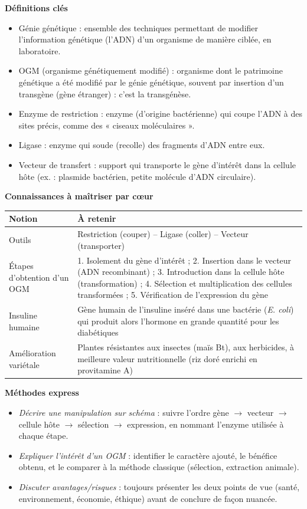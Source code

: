 \documentclass[11pt]{article}
\newcommand{\cle}[1]{{\popxbold\color{popdark}#1}}
\begin{document}
\begin{bilan}
\textbf{Définitions clés}
\begin{itemize}
  \item \cle{Génie génétique} : ensemble des techniques permettant de modifier l'information génétique (l'ADN) d'un organisme de manière ciblée, en laboratoire.
  \item \cle{OGM} (organisme génétiquement modifié) : organisme dont le patrimoine génétique a été modifié par le génie génétique, souvent par insertion d'un \cle{transgène} (gène étranger) : c'est la \cle{transgénèse}.
  \item \cle{Enzyme de restriction} : enzyme (d'origine bactérienne) qui coupe l'ADN à des sites précis, comme des « ciseaux moléculaires ».
  \item \cle{Ligase} : enzyme qui soude (recolle) des fragments d'ADN entre eux.
  \item \cle{Vecteur de transfert} : support qui transporte le gène d'intérêt dans la cellule hôte (ex. : \cle{plasmide} bactérien, petite molécule d'ADN circulaire).
\end{itemize}

\textbf{Connaissances à maîtriser par c\oe ur}
\begin{center}
\begin{tabularx}{\linewidth}{|l|X|}
\hline
\rowcolor{popblueL} \textbf{Notion} & \textbf{À retenir} \\
\hline
Outils & Restriction (couper) -- Ligase (coller) -- Vecteur (transporter) \\
\hline
Étapes d'obtention d'un OGM & 1. Isolement du gène d'intérêt ; 2. Insertion dans le vecteur (ADN recombinant) ; 3. Introduction dans la cellule hôte (transformation) ; 4. Sélection et multiplication des cellules transformées ; 5. Vérification de l'expression du gène \\
\hline
Insuline humaine & Gène humain de l'insuline inséré dans une bactérie (\emph{E. coli}) qui produit alors l'hormone en grande quantité pour les diabétiques \\
\hline
Amélioration variétale & Plantes résistantes aux insectes (maïs Bt), aux herbicides, à meilleure valeur nutritionnelle (riz doré enrichi en provitamine A) \\
\hline
\end{tabularx}
\end{center}

\textbf{Méthodes express}
\begin{itemize}
  \item \emph{Décrire une manipulation sur schéma} : suivre l'ordre gène $\rightarrow$ vecteur $\rightarrow$ cellule hôte $\rightarrow$ sélection $\rightarrow$ expression, en nommant l'enzyme utilisée à chaque étape.
  \item \emph{Expliquer l'intérêt d'un OGM} : identifier le caractère ajouté, le bénéfice obtenu, et le comparer à la méthode classique (sélection, extraction animale).
  \item \emph{Discuter avantages/risques} : toujours présenter les deux points de vue (santé, environnement, économie, éthique) avant de conclure de façon nuancée.
\end{itemize}
\end{bilan}
\end{document}
